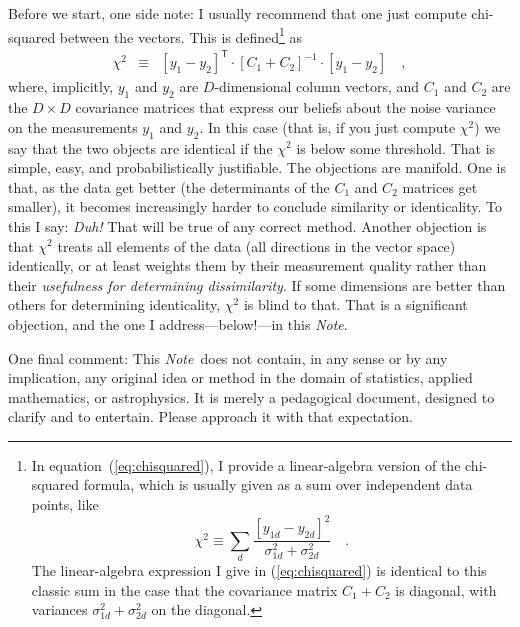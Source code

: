\documentclass[12pt,letterpaper]{article}
\newcommand{\documentname}{\textsl{Note}}
\newcommand{\equationname}{equation}
\newcommand{\tra}[1]{{#1}^{\mathsf{T}}}
\newcommand{\inv}[1]{{#1}^{-1}}
\begin{document}
Before we start, one side note: I usually recommend that one just
compute chi-squared between the vectors. This is defined\footnote{In
  \equationname~(\ref{eq:chisquared}), I provide a linear-algebra
  version of the chi-squared formula, which is usually given as a sum
  over independent data points, like
  \[\chi^2\equiv\sum_d\frac{[y_{1d}-y_{2d}]^2}{\sigma_{1d}^2+\sigma_{2d}^2} \quad .\]
  The linear-algebra expression I give in (\ref{eq:chisquared}) is
  identical to this classic sum in the case that the covariance matrix
  $C_1 + C_2$ is diagonal, with variances $\sigma_{1d}^2+\sigma_{2d}^2$ on the
  diagonal.} as
\begin{eqnarray}
\chi^2 &\equiv&
\tra{[y_1 - y_2]}\cdot\inv{[C_1 + C_2]}\cdot [y_1 - y_2] \quad ,
\label{eq:chisquared}
\end{eqnarray}
where, implicitly, $y_1$ and $y_2$ are $D$-dimensional column vectors,
and $C_1$ and $C_2$ are the $D\times D$ covariance matrices that
express our beliefs about the noise variance on the measurements $y_1$
and $y_2$. In this case (that is, if you just compute $\chi^2$) we say
that the two objects are identical if the $\chi^2$ is below some
threshold. That is simple, easy, and probabilistically
justifiable. The objections are manifold. One is that, as the data get
better (the determinants of the $C_1$ and $C_2$ matrices get smaller),
it becomes increasingly harder to conclude similarity or
identicality. To this I say: \emph{Duh!} That will be true of any
correct method. Another objection is that $\chi^2$ treats all elements
of the data (all directions in the vector space) identically, or at
least weights them by their measurement quality rather than their
\emph{usefulness for determining dissimilarity}. If some dimensions
are better than others for determining identicality, $\chi^2$ is blind
to that. That is a significant objection, and the one I
address---below!---in this \documentname.

One final comment: This \documentname\ does not contain,
in any sense or by any implication, any original idea or method in the
domain of statistics, applied mathematics, or astrophysics. It is
merely a pedagogical document, designed to clarify and to entertain.
Please approach it with that expectation.
\end{document}
